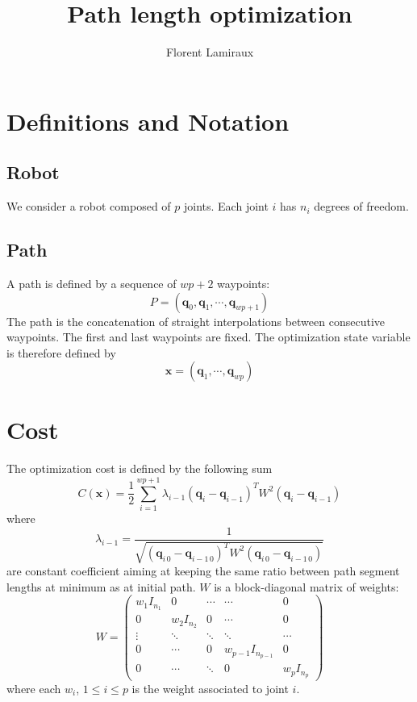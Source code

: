 \documentclass {article}
\title {Path length optimization}
\author {Florent Lamiraux}
\newcommand\cost{C}
\newcommand\path{P}
\newcommand\state{\mathbf{x}}
\newcommand\conf{\textbf{q}}
\newcommand\weight{W}
\begin{document}
\maketitle
\section {Definitions and Notation}

\subsection {Robot}
We consider a robot composed of $p$ joints. Each joint $i$ has $n_i$ degrees of freedom. 

\subsection {Path}

A path is defined by a sequence of $wp+2$ waypoints:
\begin{equation}\label{eq:def-path}
  \path = (\conf_0,\conf_1,\cdots,\conf_{wp+1})
\end{equation}
The path is the concatenation of straight interpolations between consecutive waypoints.
The first and last waypoints are fixed. The optimization state variable is therefore defined by
\begin{equation}\label{eq:def-state}
  \state = (\conf_1,\cdots,\conf_{wp})
\end{equation}

\section {Cost}

The optimization cost is defined by the following sum
\begin{equation}\label{eq:def-cost}
  \cost (\state) = \frac{1}{2}\sum_{i=1}^{wp+1} \lambda_{i-1} (\conf_{i}-\conf_{i-1})^T \weight^2 (\conf_{i}-\conf_{i-1})
\end{equation}
where
$$
\lambda_{i-1} = \frac{1}{\sqrt{(\conf_{i\,0}-\conf_{i-1\,0})^T \weight^2 (\conf_{i\,0}-\conf_{i-1\,0})}}
$$
are constant coefficient aiming at keeping the same ratio between path segment lengths at minimum as at initial path.
$\weight$ is a block-diagonal matrix of weights:
\begin{equation}\label{def-weight}
W = \left(\begin{array}{ccccc}
w_1 I_{n_1} & 0 & \cdots & \cdots & 0 \\
0 & w_2 I_{n_2} & 0 & \cdots & 0 \\
\vdots & \ddots & \ddots & \ddots & \cdots \\
0 & \cdots & 0 & w_{p-1} I_{n_{p-1}} & 0 \\
0 & \cdots & \ddots & 0 & w_p I_{n_p}
\end{array}\right)
\end{equation}
where each $w_i$, $1 \leq i \leq p$ is the weight associated to joint $i$.
\end{document}
